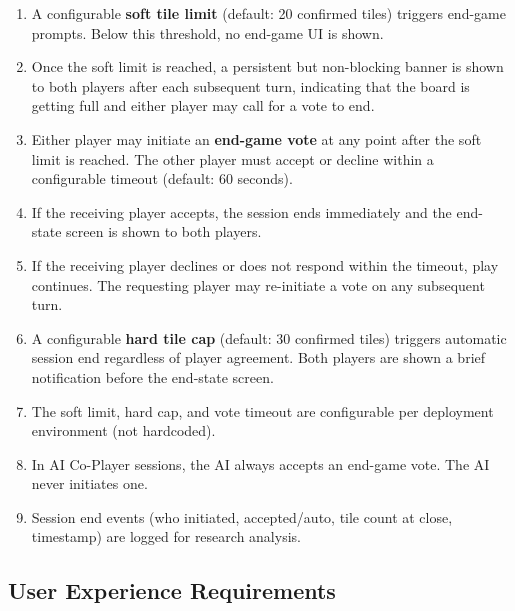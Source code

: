 \documentclass[11pt]{article}
\begin{document}
\begin{enumerate}
  \item[\textbf{FR-19}] A configurable \textbf{soft tile limit} (default: 20 confirmed tiles)
        triggers end-game prompts. Below this threshold, no end-game UI is shown.
  \item[\textbf{FR-20}] Once the soft limit is reached, a persistent but non-blocking banner
        is shown to both players after each subsequent turn, indicating that the board is
        getting full and either player may call for a vote to end.
  \item[\textbf{FR-21}] Either player may initiate an \textbf{end-game vote} at any point
        after the soft limit is reached. The other player must accept or decline within a
        configurable timeout (default: 60 seconds).
  \item[\textbf{FR-22}] If the receiving player accepts, the session ends immediately and the
        end-state screen is shown to both players.
  \item[\textbf{FR-23}] If the receiving player declines or does not respond within the
        timeout, play continues. The requesting player may re-initiate a vote on any subsequent
        turn.
  \item[\textbf{FR-24}] A configurable \textbf{hard tile cap} (default: 30 confirmed tiles)
        triggers automatic session end regardless of player agreement. Both players are shown
        a brief notification before the end-state screen.
  \item[\textbf{FR-25}] The soft limit, hard cap, and vote timeout are configurable per
        deployment environment (not hardcoded).
  \item[\textbf{FR-26}] In AI Co-Player sessions, the AI always accepts an end-game vote.
        The AI never initiates one.
  \item[\textbf{FR-27}] Session end events (who initiated, accepted/auto, tile count at close,
        timestamp) are logged for research analysis.
\end{enumerate}

\subsection{User Experience Requirements}
\end{document}
